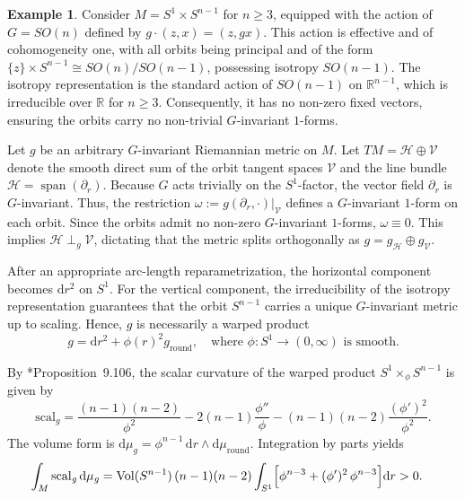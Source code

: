 \documentclass[12pt,a4paper]{amsart}
\theoremstyle{plain}
\theoremstyle{definition}
\newtheorem{example}[theorem]{Example}
\theoremstyle{remark}
\newcommand{\ga}{\mathit{g}} %
\begin{document}
\begin{example}\label{eq:product-of}
Consider $M = S^1 \times S^{n-1}$ for $n \ge 3$, equipped with the action of $G = SO(n)$ defined by $g \cdot (z, x) = (z, gx)$. This action is effective and of cohomogeneity one, with all orbits being principal and of the form $\{z\} \times S^{n-1} \cong SO(n)/SO(n-1)$, possessing isotropy $SO(n-1)$. The isotropy representation is the standard action of $SO(n-1)$ on $\mathbb{R}^{n-1}$, which is irreducible over $\mathbb{R}$ for $n \ge 3$. Consequently, it has no non-zero fixed vectors, ensuring the orbits carry no non-trivial $G$-invariant $1$-forms.

Let $\ga$ be an arbitrary $G$-invariant Riemannian metric on $M$. Let $TM = \mathcal{H} \oplus \mathcal{V}$ denote the smooth direct sum of the orbit tangent spaces $\mathcal{V}$ and the line bundle $\mathcal{H} = \operatorname{span}(\partial_r)$. Because $G$ acts trivially on the $S^1$-factor, the vector field $\partial_r$ is $G$-invariant. Thus, the restriction $\omega := \ga(\partial_r,\cdot)|_{\mathcal{V}}$ defines a $G$-invariant $1$-form on each orbit. Since the orbits admit no non-zero $G$-invariant $1$-forms, $\omega \equiv 0$. This implies $\mathcal{H} \perp_{\ga} \mathcal{V}$, dictating that the metric splits orthogonally as $\ga = \ga_{\mathcal{H}} \oplus \ga_{\mathcal{V}}$.

After an appropriate arc-length reparametrization, the horizontal component becomes $\mathrm{d}r^2$ on $S^1$. For the vertical component, the irreducibility of the isotropy representation guarantees that the orbit $S^{n-1}$ carries a unique $G$-invariant metric up to scaling. Hence, $\ga$ is necessarily a warped product
\begin{equation}
    \ga = \mathrm{d}r^2 + \phi(r)^2 g_{\mathrm{round}}, \quad \text{where } \phi \colon S^1 \to (0,\infty) \text{ is smooth.}
\end{equation}

By \cite{besse1987einstein}*{Proposition~9.106}, the scalar curvature of the warped product $S^1 \times_\phi S^{n-1}$ is given by
\begin{equation}
    \mathrm{scal}_{\ga} = \frac{(n-1)(n-2)}{\phi^2} - 2(n-1)\frac{\phi''}{\phi} - (n-1)(n-2)\frac{(\phi')^2}{\phi^2}.
\end{equation}
The volume form is $\mathrm{d}\mu_{\ga} = \phi^{n-1}\,\mathrm{d}r \wedge \mathrm{d}\mu_{\mathrm{round}}$. Integration by parts yields
\begin{align}
    \int_M \mathrm{scal}_{\ga} \,\mathrm{d}\mu_{\ga} &= \mathrm{Vol}(S^{n-1})\,(n-1)(n-2)\int_{S^1} \Bigl[ \phi^{n-3} + (\phi')^2\,\phi^{n-3} \Bigr] \mathrm{d}r > 0.
\end{align}
\end{example}
\end{document}
